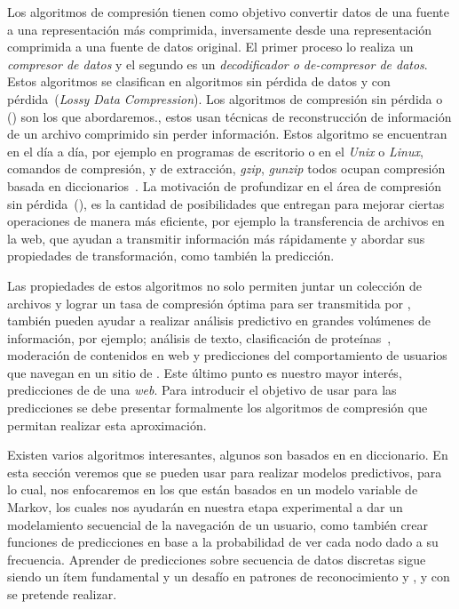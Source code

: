 Los algoritmos de compresión tienen como objetivo convertir datos de una fuente a una representación más comprimida, inversamente desde una representación comprimida a una fuente de datos original. El primer proceso lo realiza un \emph{compresor de datos} y el segundo es un \emph{decodificador o de-compresor de datos}. Estos algoritmos se clasifican en algoritmos sin pérdida de datos  y con pérdida~(\emph{Lossy Data Compression}). Los algoritmos de compresión sin pérdida o  \losslessdatacompression(\LDC) son los que abordaremos., estos usan técnicas de reconstrucción de información de un archivo comprimido sin perder información. Estos algoritmo se encuentran en el día a día, por ejemplo en programas de escritorio o en el \emph{Unix} o \emph{Linux}, comandos de compresión, y de extracción, \emph{gzip}, \emph{gunzip} todos ocupan compresión basada en diccionarios~\cite{MengyiPu2006}. La motivación de profundizar en el área de compresión sin pérdida~(\LDC), es la cantidad de posibilidades que entregan para mejorar ciertas operaciones de manera más eficiente, por ejemplo la  transferencia de archivos en la web, que ayudan a transmitir información más rápidamente y abordar sus propiedades de transformación, como también la predicción.


Las propiedades de estos algoritmos no solo permiten juntar un colección de archivos y lograr un tasa de compresión óptima para ser transmitida por \inet, también pueden ayudar a realizar análisis predictivo en grandes volúmenes de información, por ejemplo; análisis de texto, clasificación de proteínas~\cite[sección 6]{Begleiter2004}, moderación de contenidos en web y predicciones del comportamiento de usuarios que navegan en un sitio de \inet. Este último punto es nuestro mayor interés, predicciones de \webasccesslog de una \emph{web}. Para introducir el objetivo de usar \LDC para las predicciones se debe presentar formalmente los algoritmos de compresión que permitan realizar esta aproximación.

Existen varios algoritmos \losslessdatacompression interesantes, algunos son basados en en diccionario. En esta sección veremos que se pueden usar para realizar modelos predictivos, para lo cual, nos enfocaremos en los que están basados en un modelo variable de Markov, los cuales nos ayudarán en nuestra etapa experimental a dar un modelamiento secuencial de la navegación de un usuario, como también crear funciones de predicciones en base a la probabilidad de ver cada nodo dado a su frecuencia. Aprender de predicciones sobre secuencia de datos discretas sigue siendo un ítem fundamental y un desafío en patrones de reconocimiento y \machinelearning, y con \LDC se pretende realizar.





